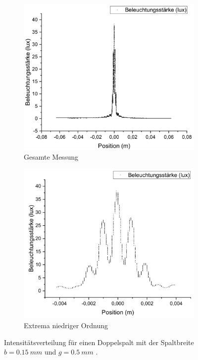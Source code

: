 \documentclass[
	a4paper,
	12pt,
	pagesize,
	ngerman
]{scrartcl}
\begin{document}
	\begin{figure}[H]
		\centering
		\begin{subfigure}{.5\textwidth}
			\centering
			\includegraphics[width=1\linewidth]{Doppelspaltb0-15mmg0-5mmNOZOOM}
			\caption{Gesamte Messung}	
		\end{subfigure}%
		\begin{subfigure}{.5\textwidth}
			\centering
			\includegraphics[width=1\linewidth]{Doppelspaltb0-15mmg0-5mm}
			\caption{Extrema niedriger Ordnung}
		\end{subfigure}
		\caption{Intensitätsverteilung für einen Doppelspalt mit der Spaltbreite $b = \SI{0,15}{mm}$ und $g = \SI{0,5}{mm} $ .}
		\label{Doppelspalt0-15mm}
	\end{figure}
	
\end{document}
